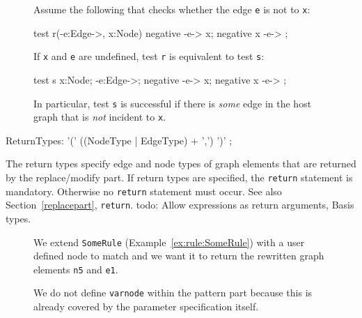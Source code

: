 \begin{figure}[htbp]
\begin{example}
Assume the following  that checks whether the edge \texttt{e} is not  to \texttt{x}:
\begin{grgen}
test r(-e:Edge->, x:Node) {
  negative {
    -e-> x;
  }
  negative {
    x -e-> ;
  }
}
\end{grgen}
If \texttt{x} and \texttt{e} are undefined, test \texttt{r} is equivalent to test \texttt{s}:
\begin{grgen}
test s {
  x:Node;
  -e:Edge->;
  negative {
    -e-> x;
  }
  negative {
    x -e-> ;
  }
}
\end{grgen}
In particular, test \texttt{s} is successful if there is \emph{some} edge in the host graph that is \emph{not} incident to \texttt{x}.
\end{example}
\end{figure}

\begin{rail}
  ReturnTypes: '(' ((NodeType | EdgeType) + ',') ')' ;
\end{rail}
The return types specify edge and node types of graph elements that are returned by the replace/modify part. If return types are specified, the \texttt{return} statement is mandatory. Otherwise no \texttt{return} statement must occur. See also Section~\ref{replacepart}, \texttt{return}.
todo: Allow expressions as return arguments, Basis types.
\begin{figure}[htbp]
\begin{example}\label{ex:rule:someruleext}
We extend \texttt{SomeRule} (Example~\ref{ex:rule:SomeRule}) with a user defined node to match and we want it to return the rewritten graph elements \texttt{n5} and \texttt{e1}.
\begin{grgen}
  rule SomeRuleExt(varnode:Node):(Node, EdgeTypeB) {
    n1:NodeTypeA;
    ...
    
    replace {
      varnode;
      ...  
      return(n5, e1);
      eval {
        ...
\end{grgen}
We do not define \texttt{varnode} within the pattern part because this is already covered by the parameter specification itself.
\end{example}
\end{figure}

